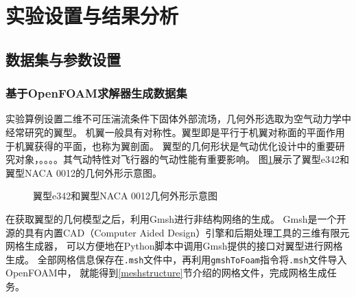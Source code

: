 \section{实验设置与结果分析}

\subsection{数据集与参数设置}

\subsubsection{基于OpenFOAM求解器生成数据集}
实验算例设置二维不可压湍流条件下固体外部流场，几何外形选取为空气动力学中经常研究的翼型。
机翼一般具有对称性。翼型即是平行于机翼对称面的平面作用于机翼获得的平面，也称为翼剖面。
翼型的几何形状是气动优化设计中的重要研究对象，。。。。其气动特性对飞行器的气动性能有重要影响。
图\ref{fig:airfoil_example}展示了翼型e342和翼型NACA 0012的几何外形示意图\cite{UIUCsite}。
\begin{figure}[htb]
	\centering
	 \qquad
	\caption{翼型e342和翼型NACA 0012几何外形示意图}
	\label{fig:airfoil_example}
\end{figure}

在获取翼型的几何模型之后，利用Gmsh\cite{gmsh}进行非结构网络的生成。
Gmsh是一个开源的具有内置CAD（Computer Aided Design）引擎和后期处理工具的三维有限元网格生成器，
可以方便地在Python脚本中调用Gmsh提供的接口对翼型进行网格生成。
全部网格信息保存在\texttt{.msh}文件中，再利用\texttt{gmshToFoam}指令将\texttt{.msh}文件导入OpenFOAM中，
就能得到\ref{meshstructure}节介绍的网格文件，完成网格生成任务。

